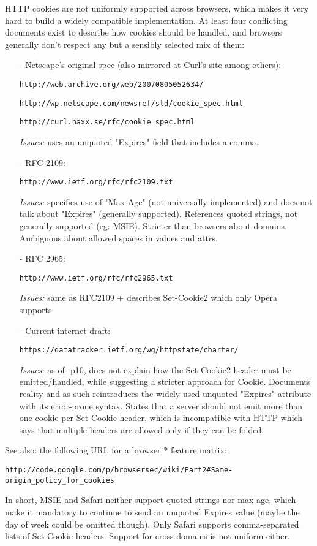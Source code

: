 HTTP cookies are not uniformly supported across browsers, which makes it very
hard to build a widely compatible implementation. At least four conflicting
documents exist to describe how cookies should be handled, and browsers
generally don't respect any but a sensibly selected mix of them:

\begin{itemize}
\item[-] Netscape's original spec (also mirrored at Curl's site among others):

    \verb|http://web.archive.org/web/20070805052634/|
    
    \verb|http://wp.netscape.com/newsref/std/cookie_spec.html|
    
    \verb|http://curl.haxx.se/rfc/cookie_spec.html|

    \emph{Issues:} uses an unquoted "Expires" field that includes a comma.

\item[-] RFC 2109:

    \verb|http://www.ietf.org/rfc/rfc2109.txt|

    \emph{Issues:} specifies use of "Max-Age" (not universally implemented) and does
            not talk about "Expires" (generally supported). References quoted
            strings, not generally supported (eg: MSIE). Stricter than browsers
            about domains. Ambiguous about allowed spaces in values and attrs.

\item[-] RFC 2965:
    
    \verb|http://www.ietf.org/rfc/rfc2965.txt|

    \emph{Issues:} same as RFC2109 + describes Set-Cookie2 which only Opera supports.

\item[-] Current internet draft:
    
    \verb|https://datatracker.ietf.org/wg/httpstate/charter/|

    \emph{Issues:} as of -p10, does not explain how the Set-Cookie2 header must be
            emitted/handled, while suggesting a stricter approach for Cookie.
            Documents reality and as such reintroduces the widely used unquoted
            "Expires" attribute with its error-prone syntax. States that a
            server should not emit more than one cookie per Set-Cookie header,
            which is incompatible with HTTP which says that multiple headers
            are allowed only if they can be folded.
\end{itemize}

See also: the following URL for a browser * feature matrix:

   \verb|http://code.google.com/p/browsersec/wiki/Part2#Same-origin_policy_for_cookies|

In short, MSIE and Safari neither support quoted strings nor max-age, which
make it mandatory to continue to send an unquoted Expires value (maybe the
day of week could be omitted though). Only Safari supports comma-separated
lists of Set-Cookie headers. Support for cross-domains is not uniform either.
